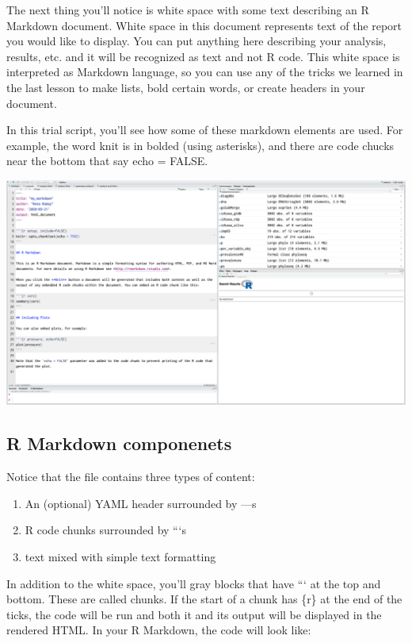 \documentclass[
]{book}
\providecommand{\tightlist}{%
  \setlength{\itemsep}{0pt}\setlength{\parskip}{0pt}}
\begin{document}
The next thing you'll notice is white space with some text describing an R Markdown document. White space in this document represents text of the report you would like to display. You can put anything here describing your analysis, results, etc. and it will be recognized as text and not R code. This white space is interpreted as Markdown language, so you can use any of the tricks we learned in the last lesson to make lists, bold certain words, or create headers in your document.

In this trial script, you'll see how some of these markdown elements are used. For example, the word knit is in bolded (using asterisks), and there are code chucks near the bottom that say echo = FALSE.

\includegraphics{img/firstmd.png}

\hypertarget{r-markdown-componenets}{%
\subsection{R Markdown componenets}\label{r-markdown-componenets}}

Notice that the file contains three types of content:

\begin{enumerate}
\def\labelenumi{\arabic{enumi}.}
\tightlist
\item
  An (optional) YAML header surrounded by ---s
\item
  R code chunks surrounded by ```s
\item
  text mixed with simple text formatting
\end{enumerate}

In addition to the white space, you'll gray blocks that have ``` at the top and bottom. These are called chunks. If the start of a chunk has \{r\} at the end of the ticks, the code will be run and both it and its output will be displayed in the rendered HTML. In your R Markdown, the code will look like:
\end{document}
